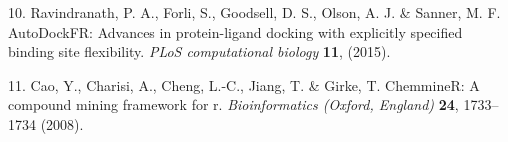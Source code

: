 \documentclass[
]{article}
\newenvironment{cslreferences}%
  {}%
  {\par}
\begin{document}
\begin{cslreferences}
\leavevmode\hypertarget{ref-AutodockfrAdvRavind2015}{}%
10. Ravindranath, P. A., Forli, S., Goodsell, D. S., Olson, A. J. \& Sanner, M. F. AutoDockFR: Advances in protein-ligand docking with explicitly specified binding site flexibility. \emph{PLoS computational biology} \textbf{11}, (2015).

\leavevmode\hypertarget{ref-ChemminerACoCaoY2008}{}%
11. Cao, Y., Charisi, A., Cheng, L.-C., Jiang, T. \& Girke, T. ChemmineR: A compound mining framework for r. \emph{Bioinformatics (Oxford, England)} \textbf{24}, 1733--1734 (2008).
\end{cslreferences}
\end{document}
